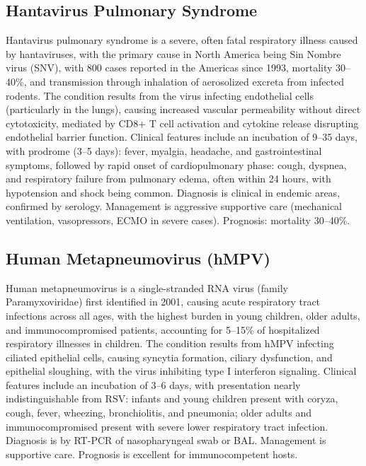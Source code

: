 \subsection{Hantavirus Pulmonary Syndrome}
\label{sec:Hantavirus Pulmonary Syndrome}
Hantavirus pulmonary syndrome is a severe, often fatal respiratory illness caused by hantaviruses, with the primary cause in North America being Sin Nombre virus (SNV), with 800 cases reported in the Americas since 1993, mortality 30--40\%, and transmission through inhalation of aerosolized excreta from infected rodents. The condition results from the virus infecting endothelial cells (particularly in the lungs), causing increased vascular permeability without direct cytotoxicity, mediated by CD8+ T cell activation and cytokine release disrupting endothelial barrier function. Clinical features include an incubation of 9--35 days, with prodrome (3--5 days): fever, myalgia, headache, and gastrointestinal symptoms, followed by rapid onset of cardiopulmonary phase: cough, dyspnea, and respiratory failure from pulmonary edema, often within 24 hours, with hypotension and shock being common. Diagnosis is clinical in endemic areas, confirmed by serology. Management is aggressive supportive care (mechanical ventilation, vasopressors, ECMO in severe cases). Prognosis: mortality 30--40\%.

\subsection{Human Metapneumovirus (hMPV)}
\label{sec:Human Metapneumovirus}
Human metapneumovirus is a single-stranded RNA virus (family Paramyxoviridae) first identified in 2001, causing acute respiratory tract infections across all ages, with the highest burden in young children, older adults, and immunocompromised patients, accounting for 5--15\% of hospitalized respiratory illnesses in children. The condition results from hMPV infecting ciliated epithelial cells, causing syncytia formation, ciliary dysfunction, and epithelial sloughing, with the virus inhibiting type I interferon signaling. Clinical features include an incubation of 3--6 days, with presentation nearly indistinguishable from RSV: infants and young children present with coryza, cough, fever, wheezing, bronchiolitis, and pneumonia; older adults and immunocompromised present with severe lower respiratory tract infection. Diagnosis is by RT-PCR of nasopharyngeal swab or BAL. Management is supportive care. Prognosis is excellent for immunocompetent hosts.

